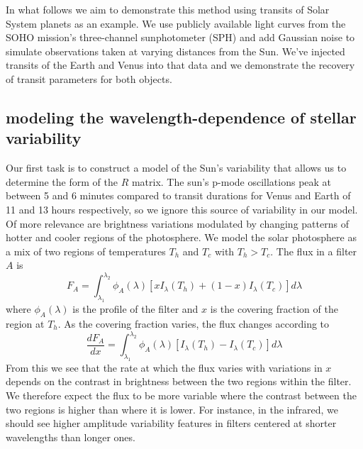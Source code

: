 \documentclass[preprint2]{aastex62}
\begin{document}
    In what follows we aim to demonstrate this method using transits of Solar System planets as an example. We use publicly available 
    light curves from the SOHO mission's three-channel sunphotometer (SPH) \citep{Frohlich1995, Frohlich1997, Jimenez2002} and add Gaussian noise to simulate observations 
    taken at varying distances from the Sun. We've injected transits of the Earth and Venus into that data and we demonstrate 
    the recovery of transit parameters for both objects. 
    \subsection{modeling the wavelength-dependence of stellar variability}
        Our first task is to construct a model of the Sun's variability that allows us to determine the form of the $R$ matrix. The sun's p-mode oscillations peak at between 5 and 6 minutes \citep{Kiefer2018} compared to transit durations for Venus and Earth 
        of 11 and 13 hours respectively, so we ignore this source of variability in our model. Of more relevance are brightness variations modulated by changing patterns of 
        hotter and cooler regions of the photosphere. We model the solar photosphere as 
        a mix of two regions of temperatures $T_h$ and $T_c$ with $T_h > T_c$. The flux 
        in a filter $A$ is 
        \begin{equation}
            F_A = \int_{\lambda_1}^{\lambda_2}\phi_A(\lambda)\left[xI_\lambda(T_h)+(1-x)I_\lambda(T_c)\right]d\lambda
        \end{equation}
        where $\phi_A(\lambda)$ is the profile of the filter and $x$ is the covering fraction of the region at $T_h$.
        As the covering fraction varies, the flux changes according to
        \begin{equation}
            \frac{dF_A}{dx} = \int_{\lambda_1}^{\lambda_2}\phi_A(\lambda)\left[I_\lambda(T_h)-I_\lambda(T_c)\right]d\lambda
        \end{equation}
        From this we see that the rate at which the flux varies with variations in $x$ depends on the 
        contrast in brightness between the two regions within the filter. We therefore expect the flux 
        to be more variable where the contrast between the two regions is higher than where it is lower. For 
        instance, in the infrared, we should see higher amplitude variability features in filters 
        centered at shorter wavelengths than longer ones. 
        
\end{document}
